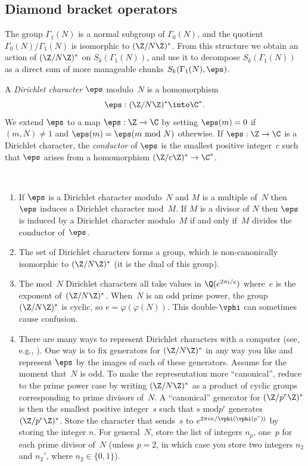 \documentclass{report}
\begin{document}
\subsection{Diamond bracket operators}


The group $\Gamma_1(N)$ is a normal subgroup of $\Gamma_0(N)$, and
the quotient $\Gamma_0(N)/\Gamma_1(N)$ is isomorphic to
$(\Z/N\Z)^*$.  From this structure we obtain an action of
$(\Z/N\Z)^*$ on $S_k(\Gamma_1(N))$, and use it to decompose
$S_k(\Gamma_1(N))$ as a direct sum of more  manageable chunks
$S_k(\Gamma_1(N),\eps)$.


\begin{definition}
A {\em Dirichlet character} $\eps$ modulo~$N$ is a homomorphism
\[
  \eps:(\Z/N\Z)^{*}\into\C^{*}.
\]
We extend $\eps$ to a map $\eps:\Z\to\C$ by setting $\eps(m)=0$ if
$(m,N)\neq 1$ and $\eps(m)=\eps(m\text{ mod }N)$ otherwise.  If
$\eps:\Z\to \C$ is a Dirichlet character, the {\em conductor} of
$\eps$ is the smallest positive integer~$c$ such that $\eps$
arises from a homomorphism $(\Z/c\Z)^*\to\C^*$.
\end{definition}

\begin{remarks}\mbox{}\\
\begin{enumerate}
\item If $\eps$ is a Dirichlet character modulo~$N$ and $M$ is a
multiple of~$N$ then~$\eps$ induces a Dirichlet character mod~$M$.
If $M$ is a divisor of $N$ then $\eps$ is induced by a Dirichlet
character modulo~$M$ if and only if~$M$ divides the
conductor of~$\eps$.%
\item The set of Dirichlet characters forms a group, which is
non-canonically isomorphic to $(\Z/N\Z)^*$ (it is the dual of this
group).
%
\item The mod~$N$ Dirichlet characters all take values in
$\Q(e^{2\pi i/e})$ where~$e$ is the exponent of~$(\Z/N\Z)^*$.
When~$N$ is an odd prime power, the group $(\Z/N\Z)^*$ is cyclic,
so $e = \varphi(\varphi(N))$. This double-$\vphi$ can sometimes cause confusion.%
\item There are many ways to represent Dirichlet characters with a
computer (see, e.g., \cite[Ch.~4]{stein:book}).  One way is to fix
generators for $(\Z/N\Z)^*$ in any way you like and represent
$\eps$ by the images of each of these generators.   Assume for the
moment that~$N$ is odd. To make the representation more
``canonical'', reduce to the prime power case by writing
$(\Z/N\Z)^*$ as a product of cyclic groups corresponding to prime
divisors of~$N$.  A ``canonical'' generator for $(\Z/p^r\Z)^*$ is
then the smallest positive integer~$s$ such that $s\text{ mod
}p^r$ generates $(\Z/p^r\Z)^*$.   Store the character that
sends~$s$ to $e^{2\pi i n/\vphi(\vphi(p^r))}$ by storing the
integer $n$. For general~$N$, store the list of integers $n_p$,
one~$p$ for each prime divisor of~$N$ (unless $p=2$, in which case
you store two integers $n_2$ and $n_2'$, where $n_2\in\{0,1\}$).
\end{enumerate}
\end{remarks}
\end{document}

